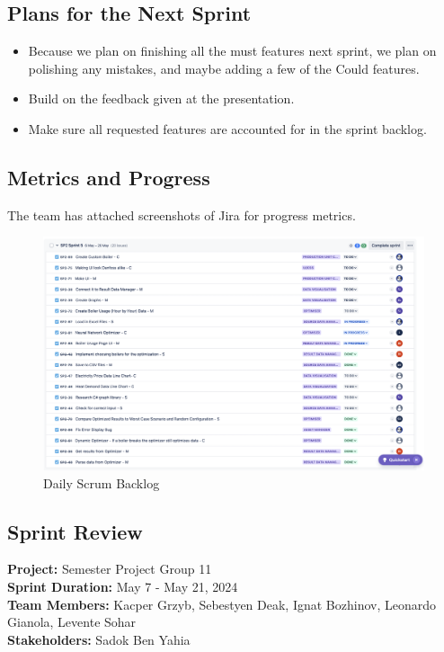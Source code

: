 \documentclass[12pt]{report}
\begin{document}
\subsection*{Plans for the Next Sprint}
\begin{itemize}
    \item Because we plan on finishing all the must features next sprint, we plan on polishing any mistakes, and maybe adding a few of the Could features.
    \item Build on the feedback given at the presentation.
    \item Make sure all requested features are accounted for in the sprint backlog.
\end{itemize}

\subsection*{Metrics and Progress}
The team has attached screenshots of Jira for progress metrics.

\begin{figure}[H]
  \centering
  \includegraphics[width=1\textwidth]{Resources/5-Sprint/Daily-Scrum/Jira.png}
  \caption{Daily Scrum Backlog}
  \label{fig:S5Scrum-image}
\end{figure}
\clearpage

\subsection*{Sprint Review}
\textbf{Project:} Semester Project Group 11 \\
\textbf{Sprint Duration:} May 7 - May 21, 2024 \\
\textbf{Team Members:} Kacper Grzyb, Sebestyen Deak, Ignat Bozhinov, Leonardo Gianola, Levente Sohar \\
\textbf{Stakeholders:} Sadok Ben Yahia
\end{document}
